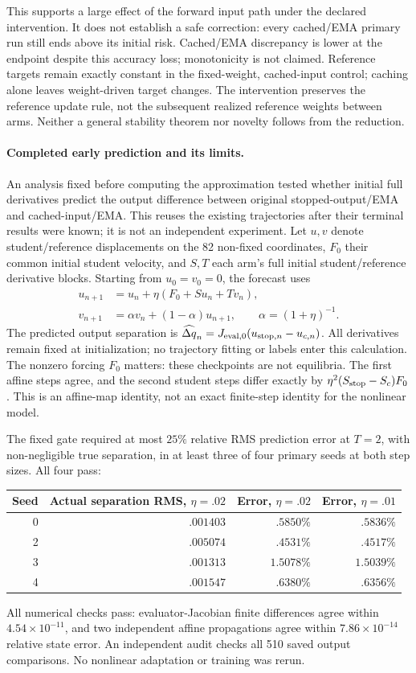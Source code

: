 \documentclass[11pt,a4paper]{article}
\begin{document}
This supports a large effect of the forward input path under the declared
intervention. It does not establish a safe correction: every cached/EMA
primary run still ends above its initial risk. Cached/EMA discrepancy is
lower at the endpoint despite this accuracy loss; monotonicity is not
claimed. Reference targets remain exactly constant in the fixed-weight,
cached-input control; caching alone leaves weight-driven target changes.
The intervention preserves the reference update rule, not the subsequent
realized reference weights between arms. Neither a general stability
theorem nor novelty follows from the reduction.

\paragraph{Completed early prediction and its limits.}
An analysis fixed before computing the approximation tested whether
initial full derivatives predict the output difference between original
stopped-output/EMA and cached-input/EMA. This reuses the existing
trajectories after their terminal results were known; it is not an
independent experiment. Let $u,v$ denote student/reference displacements
on the 82 non-fixed coordinates, $F_0$ their common initial student
velocity, and $S,T$ each arm's full initial student/reference derivative
blocks. Starting from $u_0=v_0=0$, the forecast uses
\begin{align*}
 u_{n+1}&=u_n+\eta(F_0+Su_n+Tv_n),\\
 v_{n+1}&=\alpha v_n+(1-\alpha)u_{n+1},\qquad
 \alpha=(1+\eta)^{-1}.
\end{align*}
The predicted output separation is
$\widehat{\Delta q}_n=J_{\rm eval,0}(u_{{\rm stop},n}-u_{c,n})$.
All derivatives remain fixed at initialization; no trajectory fitting
or labels enter this calculation. The nonzero forcing $F_0$ matters:
these checkpoints are not equilibria. The first affine steps agree,
and the second student steps differ exactly by
$\eta^2(S_{\rm stop}-S_c)F_0$. This is an affine-map identity, not an
exact finite-step identity for the nonlinear model.

The fixed gate required at most $25\%$ relative RMS prediction error
at $T=2$, with non-negligible true separation, in at least three of four
primary seeds at both step sizes. All four pass:
\begin{center}
\begin{tabular}{rrrr}
Seed & Actual separation RMS, $\eta=.02$ & Error, $\eta=.02$ & Error, $\eta=.01$\\ \hline
0 & $.001403$ & $.5850\%$ & $.5836\%$\\
2 & $.005074$ & $.4531\%$ & $.4517\%$\\
3 & $.001313$ & $1.5078\%$ & $1.5039\%$\\
4 & $.001547$ & $.6380\%$ & $.6356\%$
\end{tabular}
\end{center}
All numerical checks pass: evaluator-Jacobian finite differences agree
within $4.54\times10^{-11}$, and two independent affine propagations
agree within $7.86\times10^{-14}$ relative state error. An independent
audit checks all 510 saved output comparisons. No nonlinear adaptation
or training was rerun.
\end{document}

